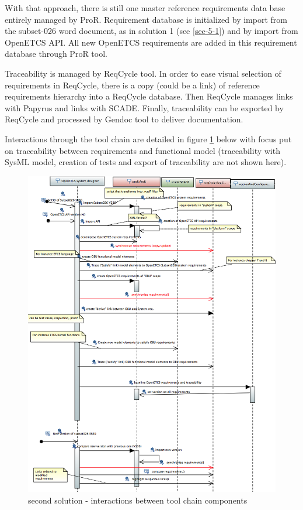 \documentclass[11pt]{template/openetcs_report}
\begin{document}
With that approach, there is still one master reference requirements data base entirely managed by ProR. Requirement database is initialized by import from the subset-026 word document, as in solution 1 (see \ref{sec-5-1}) and by import from OpenETCS API.
All new OpenETCS requirements are added in this requirement database through ProR tool.

Traceability is managed by ReqCycle tool. In order to ease visual selection of requirements in ReqCycle, there is a copy (could be a link) of reference requirements hierarchy into a ReqCycle database. Then ReqCycle manages links with Papyrus and links with SCADE. 
Finally, traceability can be exported by ReqCycle and processed by Gendoc tool to deliver documentation.

Interactions through the tool chain are detailed in figure \ref{fig:trace_second-interactions} below with focus put on traceability between requirements and functional model (traceability with SysML model, creation of tests and export of traceability are not shown here). 


\begin{figure}[tbp]
\centering
\includegraphics[width=1.0\linewidth]{images/second_trace_solution_interactions.png}
\caption{\label{fig:trace_second-interactions}second solution - interactions between tool chain components}
\end{figure}
\end{document}
